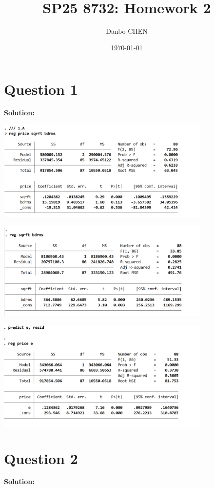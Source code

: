 \documentclass[12pt, oneside]{article}
\title{SP25 8732: Homework 2}
\author{Danbo CHEN}
\date{\today}
\begin{document}
\maketitle
\vspace{.25in}

\section{Question 1}
\textbf{Solution:}

\begin{center}
    
    \includegraphics[width=0.8\textwidth]{Figure/P1.A.jpg}

    \includegraphics[width=0.8\textwidth]{Figure/P1.B.jpg}

    \includegraphics[width=0.8\textwidth]{Figure/P1.C.jpg}

\end{center}


\section{Question 2}
\textbf{Solution:}
\end{document}
